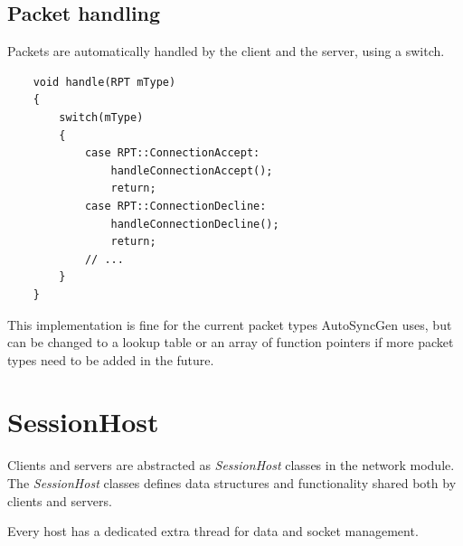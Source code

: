 \documentclass{report}
\begin{document}
            \subsection{Packet handling}
                Packets are automatically handled by the client and the server, using a switch.

                \begin{verbatim}
    void handle(RPT mType)
    {
        switch(mType)
        {
            case RPT::ConnectionAccept:
                handleConnectionAccept();
                return;
            case RPT::ConnectionDecline:
                handleConnectionDecline();
                return;
            // ...
        }
    }
                \end{verbatim}

                This implementation is fine for the current packet types AutoSyncGen uses, but can be changed to a lookup table or an array of function pointers if more packet types need to be added in the future.

        \section{SessionHost}

            Clients and servers are abstracted as \emph{SessionHost} classes in the network module.
            The \emph{SessionHost} classes defines data structures and functionality shared both by clients and servers.

            Every host has a dedicated extra thread for data and socket management.
\end{document}
